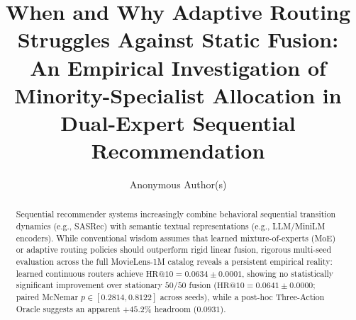 \documentclass[sigconf,nonacm]{acmart}
\begin{document}
\title[When and Why Adaptive Routing Struggles Against Static Fusion]{When and Why Adaptive Routing Struggles Against Static Fusion:\\An Empirical Investigation of Minority-Specialist Allocation in Dual-Expert Sequential Recommendation}

\author{Anonymous Author(s)}

\renewcommand{\shortauthors}{Anonymous et al.}

\begin{abstract}
Sequential recommender systems increasingly combine behavioral sequential transition dynamics (e.g., SASRec) with semantic textual representations (e.g., LLM/MiniLM encoders). While conventional wisdom assumes that learned mixture-of-experts (MoE) or adaptive routing policies should outperform rigid linear fusion, rigorous multi-seed evaluation across the full MovieLens-1M catalog reveals a persistent empirical reality: learned continuous routers achieve $\text{HR@10} = 0.0634 \pm 0.0001$, showing no statistically significant improvement over stationary $50/50$ fusion ($\text{HR@10} = 0.0641 \pm 0.0000$; paired McNemar $p \in [0.2814, 0.8122]$ across seeds), while a post-hoc Three-Action Oracle suggests an apparent $+45.2\%$ headroom ($0.0931$).


\end{abstract}
\end{document}
